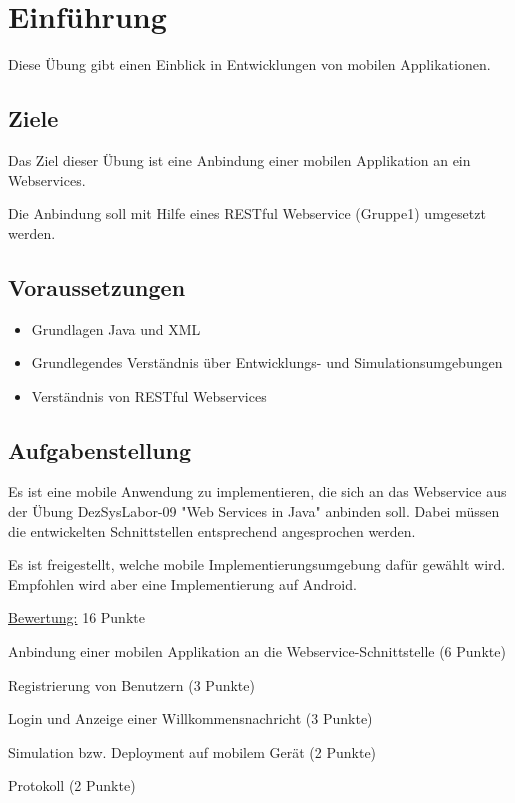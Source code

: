 
\section{Einführung}
Diese Übung gibt einen Einblick in Entwicklungen von mobilen Applikationen.

\subsection{Ziele}
Das Ziel dieser Übung ist eine Anbindung einer mobilen Applikation an ein Webservices.

Die Anbindung soll mit Hilfe eines RESTful Webservice (Gruppe1) umgesetzt werden.


\subsection{Voraussetzungen}
\begin{itemize}
\item Grundlagen Java und XML
\item Grundlegendes Verständnis über Entwicklungs- und Simulationsumgebungen
\item Verständnis von RESTful Webservices
\end{itemize}


\subsection{Aufgabenstellung}
Es ist eine mobile Anwendung zu implementieren, die sich an das Webservice aus der Übung DezSysLabor-09 "Web Services in Java" anbinden soll. Dabei müssen die entwickelten Schnittstellen entsprechend angesprochen werden.

Es ist freigestellt, welche mobile Implementierungsumgebung dafür gewählt wird. Empfohlen wird aber eine Implementierung auf Android.
\newline

\uline{Bewertung:} 16 Punkte
\begin{list}{-}
\item Anbindung einer mobilen Applikation an die Webservice-Schnittstelle (6 Punkte)
\item Registrierung von Benutzern (3 Punkte)
\item Login und Anzeige einer Willkommensnachricht (3 Punkte)
\item Simulation bzw. Deployment auf mobilem Gerät (2 Punkte)
\item Protokoll (2 Punkte)
\end{list}
\clearpage
